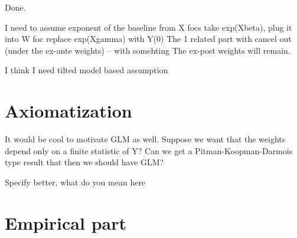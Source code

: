 \documentclass[12pt,a4paper]{article}
\begin{document}
Done.

I need to assume exponent of the baseline
from X focs take exp(Xbeta), plug it into W foc
replace exp(Xgamma) with Y(0)
The 1 related part with cancel out (under the ex-ante weights) -- with somehting
The ex-post weights will remain.

I think I need tilted model based assumption

\section{Axiomatization}

It would be cool to motivate GLM as well. Suppose we want that the weights depend only on a finite statistic of Y? Can we get a Pitman-Koopman-Darmois type result that then we should have GLM?

Specify better, what do you mean here

\section{Empirical part}

\section{}
\end{document}
